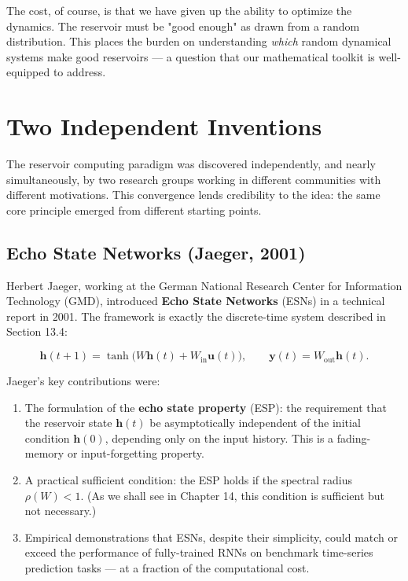 The cost, of course, is that we have given up the ability to optimize the dynamics. The reservoir must be "good enough" as drawn from a random distribution. This places the burden on understanding \textit{which} random dynamical systems make good reservoirs --- a question that our mathematical toolkit is well-equipped to address.


\bigskip


\section{Two Independent Inventions}\label{sec:13.5}

The reservoir computing paradigm was discovered independently, and nearly simultaneously, by two research groups working in different communities with different motivations. This convergence lends credibility to the idea: the same core principle emerged from different starting points.

\subsection{Echo State Networks (Jaeger, 2001)}\label{sec:13.5.1}

Herbert Jaeger, working at the German National Research Center for Information Technology (GMD), introduced \textbf{Echo State Networks} (ESNs) in a technical report in 2001. The framework is exactly the discrete-time system described in Section 13.4:

\[
\mathbf{h}(t+1) = \tanh\!\big(W\mathbf{h}(t) + W_{\text{in}}\mathbf{u}(t)\big), \qquad \mathbf{y}(t) = W_{\text{out}}\mathbf{h}(t).
\]

Jaeger's key contributions were:

\begin{enumerate}[nosep]
  \item The formulation of the \textbf{echo state property} (ESP): the requirement that the reservoir state $\mathbf{h}(t)$ be asymptotically independent of the initial condition $\mathbf{h}(0)$, depending only on the input history. This is a fading-memory or input-forgetting property.

  \item A practical sufficient condition: the ESP holds if the spectral radius $\rho(W) < 1$. (As we shall see in Chapter 14, this condition is sufficient but not necessary.)

  \item Empirical demonstrations that ESNs, despite their simplicity, could match or exceed the performance of fully-trained RNNs on benchmark time-series prediction tasks --- at a fraction of the computational cost.
\end{enumerate}

